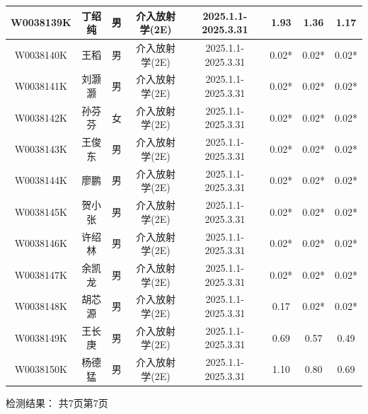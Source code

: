 \begin{table}[H]
\begin{tabular}{|c|c|c|c|c|c|c|c|}
\hline
W0038139K & 丁绍纯 & 男 & 介入放射学(2E) & 2025.1.1-2025.3.31 & 1.93 & 1.36 & 1.17 \\
\hline
W0038140K & 王稻 & 男 & 介入放射学(2E) & 2025.1.1-2025.3.31 & 0.02* & 0.02* & 0.02* \\
\hline
W0038141K & 刘灏灏 & 男 & 介入放射学(2E) & 2025.1.1-2025.3.31 & 0.02* & 0.02* & 0.02* \\
\hline
W0038142K & 孙芬芬 & 女 & 介入放射学(2E) & 2025.1.1-2025.3.31 & 0.02* & 0.02* & 0.02* \\
\hline
W0038143K & 王俊东 & 男 & 介入放射学(2E) & 2025.1.1-2025.3.31 & 0.02* & 0.02* & 0.02* \\
\hline
W0038144K & 廖鹏 & 男 & 介入放射学(2E) & 2025.1.1-2025.3.31 & 0.02* & 0.02* & 0.02* \\
\hline
W0038145K & 贺小张 & 男 & 介入放射学(2E) & 2025.1.1-2025.3.31 & 0.02* & 0.02* & 0.02* \\
\hline
W0038146K & 许绍林 & 男 & 介入放射学(2E) & 2025.1.1-2025.3.31 & 0.02* & 0.02* & 0.02* \\
\hline
W0038147K & 余凯龙 & 男 & 介入放射学(2E) & 2025.1.1-2025.3.31 & 0.02* & 0.02* & 0.02* \\
\hline
W0038148K & 胡芯源 & 男 & 介入放射学(2E) & 2025.1.1-2025.3.31 & 0.17 & 0.02* & 0.02* \\
\hline
W0038149K & 王长庚 & 男 & 介入放射学(2E) & 2025.1.1-2025.3.31 & 0.69 & 0.57 & 0.49 \\
\hline
W0038150K & 杨德猛 & 男 & 介入放射学(2E) & 2025.1.1-2025.3.31 & 1.10 & 0.80 & 0.69 \\
\hline
\end{tabular}
\end{table}


检测结果：
共7页第7页

